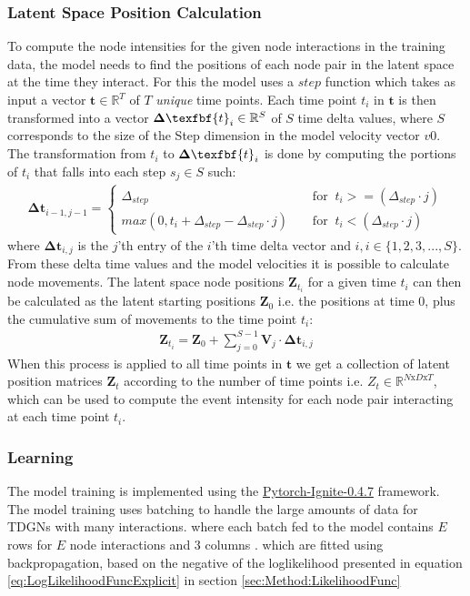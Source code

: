\subsubsection{Latent Space Position Calculation}
To compute the node intensities for the given node interactions in the training data, the model needs to find the positions of each node pair in the latent space at the time they interact. For this the model uses a $step$ function which takes as input a vector $\textbf{t} \in \mathbb{R}^{T}$ of $T$ \textit{unique} time points. Each time point $t_i$ in $\textbf{t}$ is then transformed into a vector $\boldsymbol{\Delta} \texfbf{t}_{i} \in \mathbb{R}^S$ of $S$ time delta values, where $S$ corresponds to the size of the Step dimension in the model velocity vector $v0$. The transformation from $t_i$ to $\boldsymbol{\Delta} \texfbf{t}_{i}$ is done by computing the portions of $t_i$ that falls into each step $s_j \in S$ such:
\begin{align}
    \boldsymbol{\Delta} \textbf{t}_{i-1,j-1} = 
    \begin{cases}
        \Delta_{step} \;\; &\text{for} \;\; t_i >= (\Delta_{step} \cdot j) \\
        max(0, t_i + \Delta_{step} - \Delta_{step} \cdot j) \;\; \;\; &\text{for} \;\; t_i < (\Delta_{step} \cdot j)
    \end{cases}
\end{align}
where $\boldsymbol{\Delta} \textbf{t}_{i,j}$ is the $j$'th entry of the $i$'th time delta vector and $i,i \in \{1,2,3,...,S\}$.
\\
From these delta time values and the model velocities it is possible to calculate node movements. The latent space node positions $\textbf{Z}_{t_i}$ for a given time $t_i$ can then be calculated as the latent starting positions $\textbf{Z}_{0}$ i.e. the positions at time 0, plus the cumulative sum of movements to the time point $t_i$:
\begin{align}
    \textbf{Z}_{t_i} = \textbf{Z}_{0} + \sum_{j=0}^{S-1}\textbf{V}_{j} \cdot \boldsymbol{\Delta} \textbf{t}_{i,j}
\end{align}
When this process is applied to all time points in $\textbf{t}$ we get a collection of latent position matrices $\textbf{Z}_t$ according to the number of time points i.e. $Z_t \in \mathbb{R}^{N\text{x}D\text{x}T}$, which can be used to compute the event intensity for each node pair interacting at each time point $t_i$.

\subsubsection{Learning}
\label{sec:Method:ModelImplementation:Learning}
The model training is implemented using the \hyperlink{https://pytorch.org/ignite/}{Pytorch-Ignite-0.4.7}\cite{IgniteDocumentation} framework.
 The model training uses batching to handle the large amounts of data for TDGNs with many interactions. where each batch fed to the model contains $E$ rows for $E$ node interactions and 3 columns . which are fitted using backpropagation, based on the negative of the loglikelihood presented in equation  \ref{eq:LogLikelihoodFuncExplicit} in section \ref{sec:Method:LikelihoodFunc}

